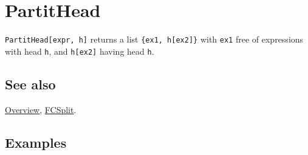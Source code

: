 \documentclass[../FeynCalcManual.tex]{subfiles}
\begin{document}
\hypertarget{partithead}{
\section{PartitHead}\label{partithead}}

\texttt{PartitHead[\allowbreak{}expr,\ \allowbreak{}h]} returns a list
\texttt{\{\allowbreak{}ex1,\ \allowbreak{}h[\allowbreak{}ex2]\}} with
\texttt{ex1} free of expressions with head \texttt{h}, and
\texttt{h[\allowbreak{}ex2]} having head \texttt{h}.

\subsection{See also}

\hyperlink{toc}{Overview}, \hyperlink{fcsplit}{FCSplit}.

\subsection{Examples}
\end{document}
